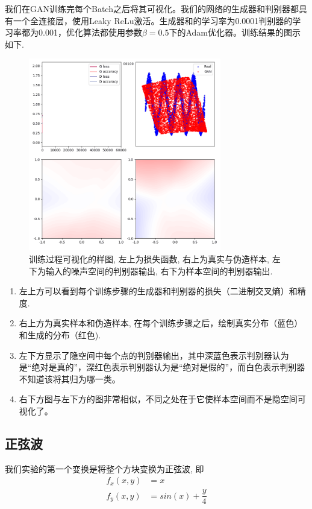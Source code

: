\documentclass[lang=cn,11pt]{elegantpaper}
\begin{document}
我们在GAN训练完每个Batch之后将其可视化。我们的网络的生成器和判别器都具有一个全连接层，使用Leaky ReLu激活。生成器和的学习率为0.0001判别器的学习率都为0.001，优化算法都使用参数$\beta=0.5$下的Adam优化器。训练结果的图示如下.

\begin{figure}[hbt]
\centering
  \includegraphics[width=0.75\textwidth]{sin_2_1}
  \caption{训练过程可视化的样图, 左上为损失函数, 右上为真实与伪造样本, 左下为输入的噪声空间的判别器输出, 右下为样本空间的判别器输出.}
\end{figure}

\begin{enumerate}
	\item 左上方可以看到每个训练步骤的生成器和判别器的损失（二进制交叉熵）和精度.
	\item 右上方为真实样本和伪造样本, 在每个训练步骤之后，绘制真实分布（蓝色）和生成的分布（红色).
	\item 左下方显示了隐空间中每个点的判别器输出，其中深蓝色表示判别器认为是“绝对是真的”，深红色表示判别器认为是“绝对是假的”，而白色表示判别器不知道该将其归为哪一类。
	\item 右下方图与左下方的图非常相似，不同之处在于它使样本空间而不是隐空间可视化了。
\end{enumerate}

\subsection{正弦波}

我们实验的第一个变换是将整个方块变换为正弦波, 即
\begin{align}
	f_x(x,y)&=x\\
	f_y(x,y)&=sin(x)+\dfrac{y}{4}
\end{align}
\end{document}
